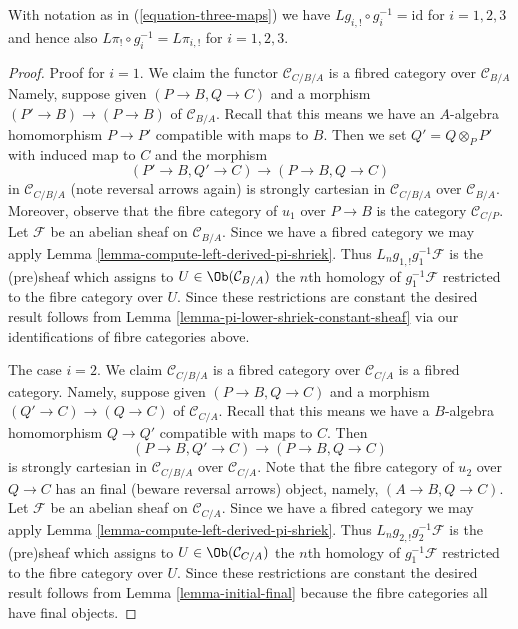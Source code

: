\begin{lemma}
\label{lemma-triangle-compute-lower-shriek}
With notation as in (\ref{equation-three-maps}) we have
$Lg_{i, !} \circ g_i^{-1} = \text{id}$ for $i = 1, 2, 3$
and hence also $L\pi_! \circ g_i^{-1} = L\pi_{i, !}$ for
$i = 1, 2, 3$.
\end{lemma}

\begin{proof}
Proof for $i = 1$. We claim the functor $\mathcal{C}_{C/B/A}$
is a fibred category over $\mathcal{C}_{B/A}$
Namely, suppose given $(P \to B, Q \to C)$
and a morphism $(P' \to B) \to (P \to B)$ of $\mathcal{C}_{B/A}$.
Recall that this means we have an $A$-algebra homomorphism
$P \to P'$ compatible with maps to $B$. Then we set $Q' = Q \otimes_P P'$
with induced map to $C$ and the morphism
$$
(P' \to B, Q' \to C) \longrightarrow (P \to B, Q \to C)
$$
in $\mathcal{C}_{C/B/A}$ (note reversal arrows again) is strongly cartesian
in $\mathcal{C}_{C/B/A}$ over $\mathcal{C}_{B/A}$. Moreover, observe
that the fibre category of $u_1$ over $P \to B$ is the category
$\mathcal{C}_{C/P}$. Let $\mathcal{F}$ be an abelian sheaf on
$\mathcal{C}_{B/A}$. Since we have a fibred category we may apply
Lemma \ref{lemma-compute-left-derived-pi-shriek}.
Thus $L_ng_{1, !}g_1^{-1}\mathcal{F}$ is the (pre)sheaf
which assigns to $U \in \Ob(\mathcal{C}_{B/A})$ the $n$th homology of
$g_1^{-1}\mathcal{F}$ restricted to the fibre category over $U$.
Since these restrictions are constant the desired result follows from
Lemma \ref{lemma-pi-lower-shriek-constant-sheaf}
via our identifications of fibre categories above.

\medskip\noindent
The case $i = 2$.
We claim $\mathcal{C}_{C/B/A}$ is a fibred category over $\mathcal{C}_{C/A}$
is a fibred category. Namely, suppose given $(P \to B, Q \to C)$
and a morphism $(Q' \to C) \to (Q \to C)$ of $\mathcal{C}_{C/A}$.
Recall that this means we have a $B$-algebra homomorphism
$Q \to Q'$ compatible with maps to $C$. Then
$$
(P \to B, Q' \to C) \longrightarrow (P \to B, Q \to C)
$$
is strongly cartesian in $\mathcal{C}_{C/B/A}$ over $\mathcal{C}_{C/A}$.
Note that the fibre category of $u_2$ over $Q \to C$ has an final
(beware reversal arrows) object, namely, $(A \to B, Q \to C)$. Let
$\mathcal{F}$ be an abelian sheaf on $\mathcal{C}_{C/A}$.
Since we have a fibred category we may apply
Lemma \ref{lemma-compute-left-derived-pi-shriek}.
Thus $L_ng_{2, !}g_2^{-1}\mathcal{F}$ is the (pre)sheaf
which assigns to $U \in \Ob(\mathcal{C}_{C/A})$ the $n$th homology of
$g_1^{-1}\mathcal{F}$ restricted to the fibre category over $U$.
Since these restrictions are constant the desired result follows from
Lemma \ref{lemma-initial-final}
because the fibre categories all have final objects.


\end{proof}
